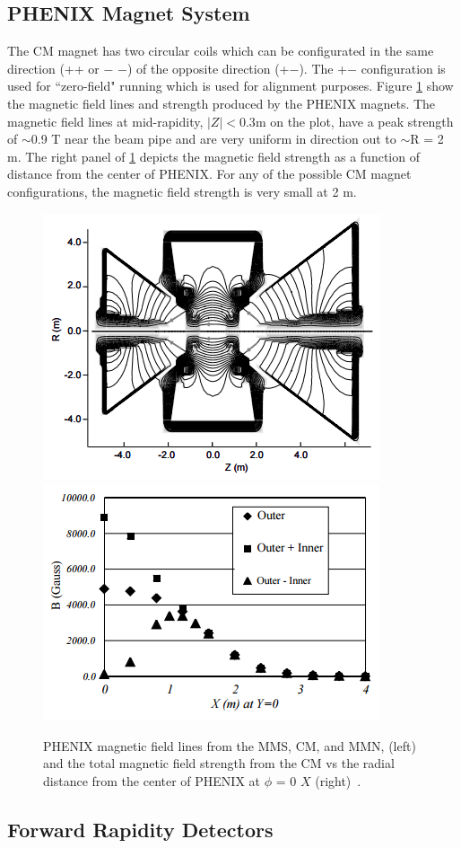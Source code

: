 \subsection{PHENIX Magnet System}
 The CM magnet has two circular coils which can be configurated in the same direction (++ or $-$ $-$) of the opposite direction (+$-$). The +$-$ configuration is used for ``zero-field" running which is used for alignment purposes. Figure \ref{fig:magnet_figures} show the magnetic field lines and strength produced by the PHENIX magnets. The magnetic field lines at mid-rapidity, $|Z| < 0.3$m on the plot, have a peak strength of $\sim$0.9 T near the beam pipe and are very uniform in direction out to $\sim$R = 2 m. The right panel of \ref{fig:magnet_figures} depicts the magnetic field strength as a function of distance from the center of PHENIX. For any of the possible CM magnet configurations, the magnetic field strength is very small at 2 m.
\begin{figure}[!ht]
\begin{center}
\includegraphics[width=0.45\linewidth]{figs/magnet_map.png}
\includegraphics[width=0.45\linewidth]{figs/magnetic_field_strength.png}
\caption{PHENIX magnetic field lines from the MMS, CM, and MMN, (left) and the total magnetic field strength from the CM vs the radial distance from the center of PHENIX at $\phi$ = 0 $X$ (right)~\cite{Aronson2003480}.}
\label{fig:magnet_figures}
\end{center}
\end{figure}
\subsection{Forward Rapidity Detectors}
